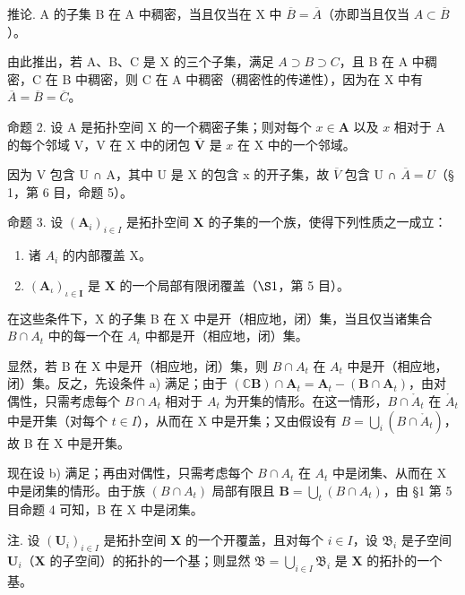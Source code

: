 推论. A 的子集 B 在 A 中稠密，当且仅当在 X 中 \(\overline{B} = \overline{A}\)（亦即当且仅当 \(A \subset \overline{B}\)）。

由此推出，若 A、B、C 是 X 的三个子集，满足 \(A \supset B \supset C\)，且 B 在 A 中稠密，C 在 B 中稠密，则 C 在 A 中稠密（稠密性的传递性），因为在 X 中有 \(\overline{A} = \overline{B} = \overline{C}\)。

命题 2. 设 A 是拓扑空间 X 的一个稠密子集；则对每个 \(x \in \mathbf{A}\) 以及 \(x\) 相对于 A 的每个邻域 V，V 在 X 中的闭包 \(\overline{\mathbf{V}}\) 是 \(x\) 在 X 中的一个邻域。

因为 V 包含 U ∩ A，其中 U 是 X 的包含 x 的开子集，故 \(\overline{V}\) 包含 U ∩ \(\overline{A} = U\)（§ 1，第 6 目，命题 5）。

命题 3. 设 \((\mathbf{A}_i)_{i\in I}\) 是拓扑空间 \(\mathbf{X}\) 的子集的一个族，使得下列性质之一成立：

\begin{enumerate}
\def\labelenumi{\alph{enumi})}
\item
  诸 \(A_{i}\) 的内部覆盖 X。
\item
  \((\mathbf{A}_{\iota})_{\iota \in \mathbf{I}}\) 是 \(\mathbf{X}\) 的一个局部有限闭覆盖（\(\S 1\)，第 5 目）。
\end{enumerate}

在这些条件下，X 的子集 B 在 X 中是开（相应地，闭）集，当且仅当诸集合 \(B \cap A_{t}\) 中的每一个在 \(A_{t}\) 中都是开（相应地，闭）集。

显然，若 B 在 X 中是开（相应地，闭）集，则 \(B \cap A_{t}\) 在 \(A_{t}\) 中是开（相应地，闭）集。反之，先设条件 a) 满足；由于 \((\mathbb{C}\mathbf{B}) \cap \mathbf{A}_{t} = \mathbf{A}_{t} - (\mathbf{B} \cap \mathbf{A}_{t})\)，由对偶性，只需考虑每个 \(B \cap A_{t}\) 相对于 \(A_{t}\) 为开集的情形。在这一情形，\(B \cap \mathring{A}_{t}\) 在 \(\mathring{A}_{t}\) 中是开集（对每个 \(t \in I\)），从而在 X 中是开集；又由假设有 \(B = \bigcup_{i} (B \cap \mathring{A}_{t})\)，故 B 在 X 中是开集。

现在设 b) 满足；再由对偶性，只需考虑每个 \(B \cap A_{t}\) 在 \(A_{t}\) 中是闭集、从而在 X 中是闭集的情形。由于族 \((B \cap A_{t})\) 局部有限且 \(\mathbf{B} = \bigcup_{t} (B \cap A_{t})\)，由 §1 第 5 目命题 4 可知，B 在 X 中是闭集。

注. 设 \((\mathbf{U}_i)_{i\in I}\) 是拓扑空间 \(\mathbf{X}\) 的一个开覆盖，且对每个 \(i\in I\)，设 \(\mathfrak{B}_i\) 是子空间 \(\mathbf{U}_i\)（\(\mathbf{X}\) 的子空间）的拓扑的一个基；则显然 \(\mathfrak{B} = \bigcup_{i\in I}\mathfrak{B}_i\) 是 \(\mathbf{X}\) 的拓扑的一个基。

